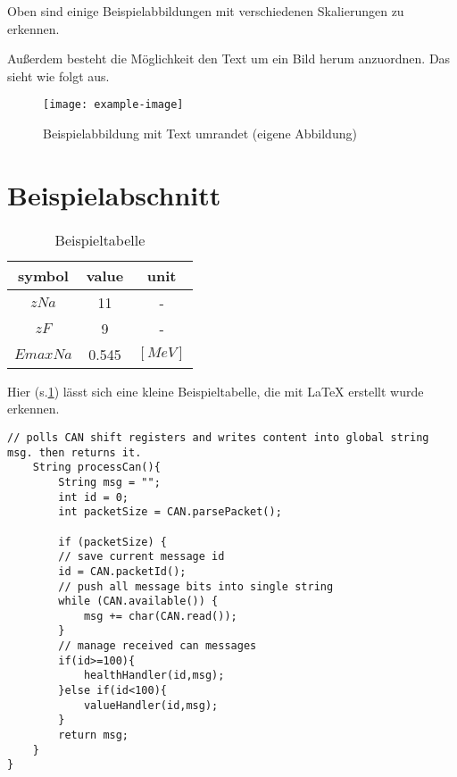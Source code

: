 \noindent Oben sind einige Beispielabbildungen mit verschiedenen Skalierungen zu erkennen.

Außerdem besteht die Möglichkeit den Text um ein Bild herum anzuordnen. Das sieht wie folgt aus.

\lipsum[1]

\begin{wrapfigure}{l}{0.4\textwidth}
    \centering
    \texttt{[image: example-image]}
    \captionsetup{width=0.9\linewidth}
    \caption[Beispielabbildung mit Text umrandet]{Beispielabbildung mit Text umrandet (eigene Abbildung)}
    \label{fig:textwrappedaroundexampleimage} %
\end{wrapfigure}

\lipsum[2-4]

\clearpage

\section{Beispielabschnitt}\label{sec:example} %

\begin{table}[!ht]
    \centering
        \begin{tabular}{ | c | c | c | }
            \hline
            symbol & value & unit \\ \hline            
            $z Na$ & 11 & - \\ \hline      
            $z F$ & 9 & - \\ \hline      
            $Emax Na$ & 0.545 & $[MeV]$ \\ \hline
        \end{tabular}
        \caption{Beispieltabelle}
        \label{tab:example} %
\end{table}

\noindent Hier (s.\cref{tab:example}) lässt sich eine kleine Beispieltabelle, die mit LaTeX erstellt wurde erkennen.

\begin{lstlisting}[caption = C++ Quellcodebeispiel, captionpos = b, label = lst:example]
    // polls CAN shift registers and writes content into global string msg. then returns it.
    String processCan(){                
        String msg = "";
        int id = 0;
        int packetSize = CAN.parsePacket();
    
        if (packetSize) {
        // save current message id
        id = CAN.packetId(); 
        // push all message bits into single string
        while (CAN.available()) {       
            msg += char(CAN.read());
        }
        // manage received can messages
        if(id>=100){                    
            healthHandler(id,msg);
        }else if(id<100){
            valueHandler(id,msg);
        } 
        return msg;
    }
}
\end{lstlisting} %

